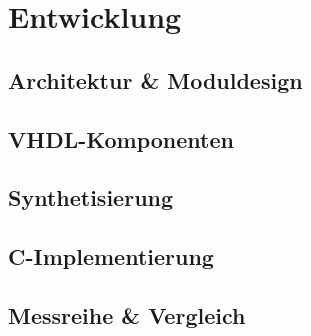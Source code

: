 
\chapter{Entwicklung} \label{sec:entwicklung}

\section{Architektur \& Moduldesign}



\section{VHDL-Komponenten}







\section{Synthetisierung}


\section{C-Implementierung} 


\section{Messreihe \& Vergleich}





